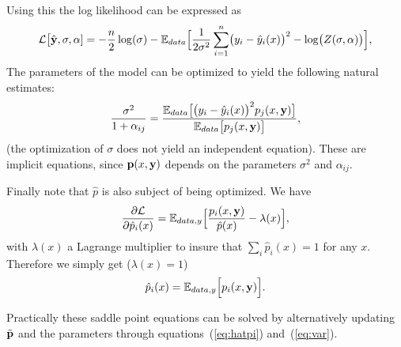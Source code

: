 \documentclass[envcountsect,runningheads]{llncs}
\theoremstyle{etoile}
\begin{document}
Using this the log likelihood can be expressed as
\[
  {\cal L}\bigl[\hat {\bf y},\sigma,{\bf \alpha}] = -\frac{n}{2}\log(\sigma)-{\mathbb E}_{data}\Bigl[\frac{1}{2\sigma^2}\sum_{i=1}^n\bigl(y_i-\hat y_i(x)\bigr)^2
    -\log\bigl(Z(\sigma,{\bf \alpha})\bigr)\Bigr],
\]
The parameters of the model can be optimized to yield the following natural estimates:
\begin{equation}\label{eq:var}
\frac{\sigma^2}{1+\alpha_{ij}} = \frac{{\mathbb E}_{data}\bigl[\bigl(y_i-\hat y_i(x)\bigr)^2p_j(x,{\bf y})\bigr]}{{\mathbb E}_{data}\bigl[p_j(x,{\bf y})\bigr]},
\end{equation}
(the optimization of $\sigma$ does not yield an independent equation).
These are implicit equations, since ${\bf p}(x,{\bf y})$ depends on the parameters $\sigma^2$ and $\alpha_{ij}$.

Finally note that $\hat p$ is also subject of being optimized. We have
\[
\frac{\partial{\cal L}}{\partial \hat p_i(x)} = {\mathbb E}_{data,y}\Bigl[\frac{p_i(x,{\bf y})}{\hat p(x)}-\lambda(x)\Bigr],
\]
with $\lambda(x)$ a Lagrange multiplier to insure that $\sum_i\hat p_i(x)=1$ for any $x$. Therefore we simply get ($\lambda(x)=1$)
\begin{equation}\label{eq:tildep}
\hat p_i(x) = {\mathbb E}_{data,y}\Bigl[p_i(x,{\bf y})\Bigr].
\end{equation}

Practically these saddle point equations can be solved by alternatively updating $\tilde {\bf p}$
and the parameters through equations~(\ref{eq:hatpi}) and~(\ref{eq:var}).
\end{document}
